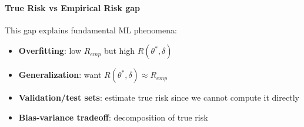 \paragraph{True Risk vs Empirical Risk gap}
This gap explains fundamental ML phenomena:
\begin{itemize}
    \item \textbf{Overfitting}: low $R_{emp}$ but high $R(\theta^*, \delta)$
    \item \textbf{Generalization}: want $R(\theta^*, \delta) \approx R_{emp}$
    \item \textbf{Validation/test sets}: estimate true risk since we cannot compute it directly
    \item \textbf{Bias-variance tradeoff}: decomposition of true risk
\end{itemize}
